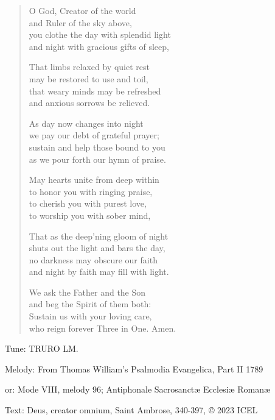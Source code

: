 \hymn

\begin{verse}
O God, Creator of the world\\
and Ruler of the sky above,\\
you clothe the day with splendid light\\
and night with gracious gifts of sleep,

That limbs relaxed by quiet rest\\
may be restored to use and toil,\\
that weary minds may be refreshed\\
and anxious sorrows be relieved.

As day now changes into night\\
we pay our debt of grateful prayer;\\
sustain and help those bound to you\\
as we pour forth our hymn of praise.

May hearts unite from deep within\\
to honor you with ringing praise,\\
to cherish you with purest love,\\
to worship you with sober mind,

That as the deep’ning gloom of night\\
shuts out the light and bars the day,\\
no darkness may obscure our faith\\
and night by faith may fill with light.

We ask the Father and the Son\\
and beg the Spirit of them both:\\
Sustain us with your loving care,\\
who reign forever Three in One. Amen.
\end{verse}

\begin{hymnsource}
Tune: TRURO LM.

Melody: From Thomas William’s Psalmodia Evangelica, Part II 1789

or: Mode VIII, melody 96; Antiphonale Sacrosanctæ Ecclesiæ Romanæ

Text: Deus, creator omnium, Saint Ambrose, 340-397, © 2023 ICEL
\end{hymnsource}